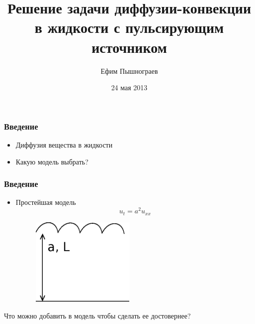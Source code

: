 \documentclass[10pt,pdf,hyperref={unicode}]{beamer}
\author{Ефим Пышнограев}
\date{24 мая 2013}
\institute{Московский государственный университет имени М. В. Ломоносова}
\title{Решение задачи диффузии-конвекции в жидкости с пульсирующим источником}
\begin{document}
\begin{frame}
  \titlepage
\end{frame}

\begin{frame}
  \frametitle{Введение}
  \begin{itemize}
    \item Диффузия вещества в жидкости
    \item Какую модель выбрать?
  \end{itemize}
\end{frame}

\begin{frame}
  \frametitle{Введение}
  \begin{itemize}
    \item Простейшая модель
      \begin{equation*}
        u_t = a^2 u_{xx}
      \end{equation*}
      \begin{figure}[ht]
        \begin{center}
          \includegraphics[width=5cm]{int1.eps}
        \end{center}
      \end{figure}
  \end{itemize}
  Что можно добавить в модель чтобы сделать ее достовернее?
\end{frame}
\end{document}
